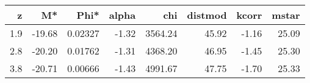 \begin{tabular}{rrrrrrrr}
\toprule
   z &     M* &     Phi* &  alpha &      chi &  distmod &  kcorr &  mstar \\
\midrule
 1.9 & -19.68 &  0.02327 &  -1.32 &  3564.24 &    45.92 &  -1.16 &  25.09 \\
 2.8 & -20.20 &  0.01762 &  -1.31 &  4368.20 &    46.95 &  -1.45 &  25.30 \\
 3.8 & -20.71 &  0.00666 &  -1.43 &  4991.67 &    47.75 &  -1.70 &  25.33 \\
\bottomrule
\end{tabular}

